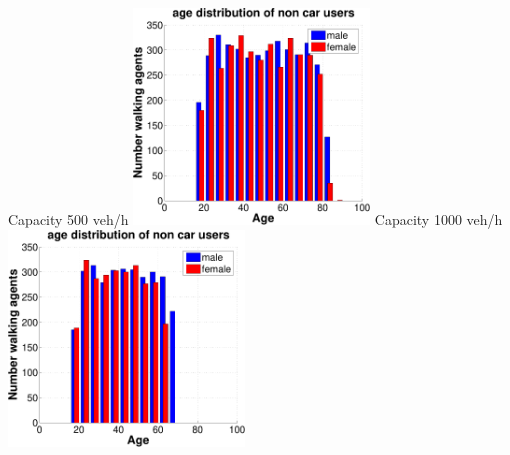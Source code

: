 {%
  \createsubfigure%
  {Capacity 500 veh/h}%
  {\includegraphics[width=0.47\textwidth, angle=0, trim=0mm 0mm 0mm 9mm, clip=true]{extending/figures/MultiModalSimulation/simulations/age_distribution_scatter_500}}%
  {\label{}}%
  {\hspace{3mm}}%
  \createsubfigure%
  {Capacity 1000 veh/h}%
  {\includegraphics[width=0.47\textwidth, angle=0, trim=0mm 0mm 0mm 9mm, clip=true]{extending/figures/MultiModalSimulation/simulations/age_distribution_scatter_1000}}%
  {\label{}}%
  {\vspace{5.5mm}}%

}
